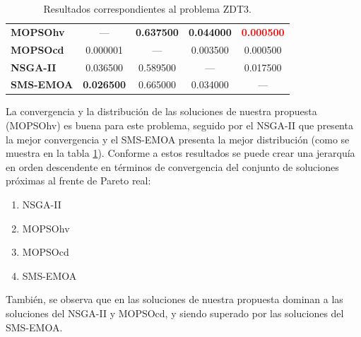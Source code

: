 \begin{table}
\begin{center}
\begin{tabular}{|l|cc|cc|}
	\textbf{MOPSOhv} &---       & \textbf{0.637500} & \textbf{0.044000} & \textbf{\textcolor{red}{0.000500 }}\\ 
	\textbf{MOPSOcd} & 0.000001 & ---      & 0.003500 & 0.000500 \\ 
	\textbf{NSGA-II} & 0.036500 & 0.589500 & ---      & 0.017500 \\  
	\textbf{SMS-EMOA}& \textbf{0.026500} & 0.665000 & 0.034000 & --- \\  
	\hline\hline
	\end{tabular}
\caption{Resultados correspondientes al problema ZDT3.}
  \label{tab:zdt3}
\end{center}
\end{table}

La convergencia y la distribuci\'on de las soluciones de nuestra propuesta (MOPSOhv) es buena para este problema, seguido por el NSGA-II 
que presenta la mejor convergencia y el SMS-EMOA presenta la mejor distribuci\'on (como se muestra en la tabla \ref{tab:zdt3}). Conforme a 
estos resultados se puede crear una jerarqu\'ia en orden descendente en t\'erminos de convergencia del conjunto de soluciones pr\'oximas al 
frente de Pareto real:

\begin{enumerate}
  \item NSGA-II
  \item MOPSOhv
  \item MOPSOcd
  \item SMS-EMOA
\end{enumerate}

Tambi\'en, se observa que en las soluciones de nuestra propuesta dominan a las soluciones del NSGA-II y MOPSOcd, y siendo superado por las 
soluciones del SMS-EMOA.

